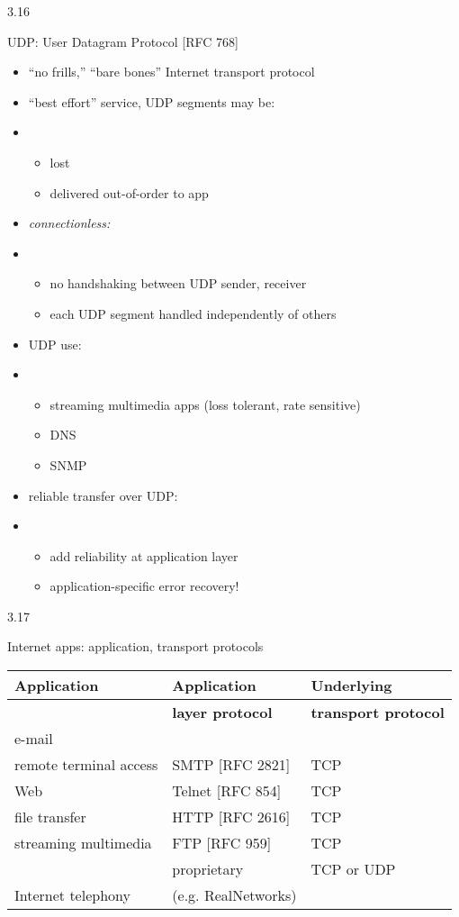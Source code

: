 \documentclass[
]{article}
\begin{document}
3.16

UDP: User Datagram Protocol {[}RFC 768{]}

\begin{itemize}
\item
  ``no frills,'' ``bare bones'' Internet transport protocol
\item
  ``best effort'' service, UDP segments may be:
\item
  \begin{itemize}
  \item
    lost
  \item
    delivered out-of-order to app
  \end{itemize}
\item
  \emph{connectionless:}
\item
  \begin{itemize}
  \item
    no handshaking between UDP sender, receiver
  \item
    each UDP segment handled independently of others
  \end{itemize}
\item
  UDP use:
\item
  \begin{itemize}
  \item
    streaming multimedia apps (loss tolerant, rate sensitive)
  \item
    DNS
  \item
    SNMP
  \end{itemize}
\item
  reliable transfer over UDP:
\item
  \begin{itemize}
  \item
    add reliability at application layer
  \item
    application-specific error recovery!
  \end{itemize}
\end{itemize}

3.17

Internet apps: application, transport protocols

\begin{longtable}[]{@{}lll@{}}
\toprule
\textbf{Application} & \textbf{Application} &
\textbf{Underlying}\tabularnewline
\midrule
\endhead
& \textbf{layer protocol} & \textbf{transport protocol}\tabularnewline
e-mail & &\tabularnewline
remote terminal access & SMTP {[}RFC 2821{]} & TCP\tabularnewline
Web & Telnet {[}RFC 854{]} & TCP\tabularnewline
file transfer & HTTP {[}RFC 2616{]} & TCP\tabularnewline
streaming multimedia & FTP {[}RFC 959{]} & TCP\tabularnewline
& proprietary & TCP or UDP\tabularnewline
Internet telephony & (e.g. RealNetworks) &\tabularnewline
\bottomrule
\end{longtable}
\end{document}
